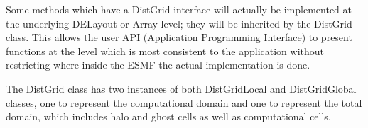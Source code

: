 Some methods which have a DistGrid interface will actually be
implemented at the underlying DELayout or Array level; they
will be inherited by the DistGrid class.  This allows the user
API (Application Programming Interface) to present functions at
the level which is most consistent to the application without
restricting where inside the ESMF the actual implementation
is done.


The DistGrid class has two instances of both DistGridLocal and
DistGridGlobal classes, one to represent the computational domain and one to represent
the total domain, which includes halo and ghost cells as well as computational cells.
